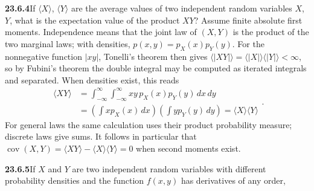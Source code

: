 \par\bigskip
\noindent\textbf{23.6.4}\quad If $\langle X\rangle$, $\langle
Y\rangle$ are the average values of two independent random
variables $X$, $Y$, what is the expectation value of the product
$XY$? 
\solution
Assume finite absolute first moments. Independence means that the joint
law of $(X,Y)$ is the product of the two marginal laws; with densities,
$p(x,y)=p_X(x)p_Y(y)$. For the nonnegative function $|xy|$, Tonelli's
theorem then gives $\langle|XY|\rangle=\langle|X|\rangle
\langle|Y|\rangle<\infty$, so by Fubini's theorem the double integral
may be computed as iterated integrals and separated.
When densities exist, this reads
\[
\boxed{\begin{aligned}
\langle XY\rangle
&=\int_{-\infty}^{\infty}\int_{-\infty}^{\infty}
 xy\,p_X(x)p_Y(y)\,dx\,dy\\
&=\left(\int xp_X(x)\,dx\right)
 \left(\int yp_Y(y)\,dy\right)
=\langle X\rangle\langle Y\rangle
\end{aligned}}.
\]
For general laws the same calculation uses their product probability
measure; discrete laws give sums.
It follows in particular that
$\operatorname{cov}(X,Y)=\langle XY\rangle-\langle X\rangle\langle Y\rangle
=0$ when second moments exist.


\par\bigskip
\noindent\textbf{23.6.5}\quad If $X$ and $Y$ are two independent
random variables with different probability densities and the
function $f(x,y)$ has derivatives of any order,
\solution
{}

